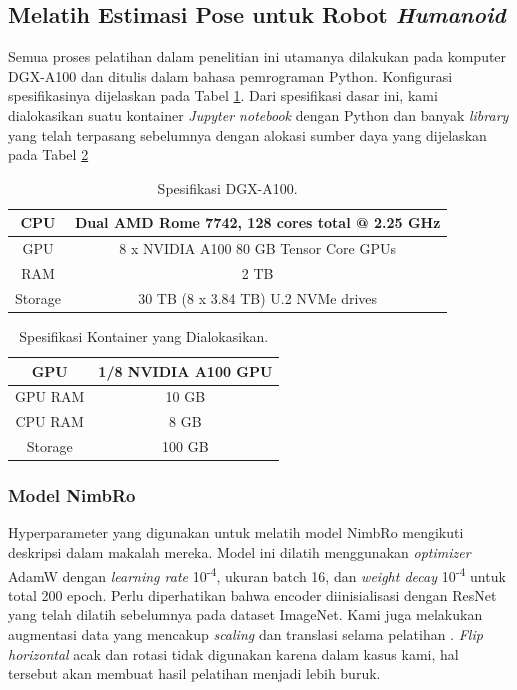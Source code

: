 \subsection{Melatih Estimasi Pose untuk Robot \textit{Humanoid}}
\label{subsec:training-robot}

Semua proses pelatihan dalam penelitian ini utamanya dilakukan pada komputer DGX-A100 dan ditulis dalam bahasa pemrograman Python. Konfigurasi spesifikasinya dijelaskan pada Tabel \ref{tb:dgxa100}.
Dari spesifikasi dasar ini, kami dialokasikan suatu kontainer \textit{Jupyter notebook} dengan Python dan banyak \textit{library} yang telah terpasang sebelumnya dengan alokasi sumber daya yang dijelaskan pada Tabel \ref{tb:allocatedcontainer}
\begin{longtable}{|c|c|}
  \caption{Spesifikasi DGX-A100.}
  \label{tb:dgxa100}\\
  \hline
  CPU     & Dual AMD Rome 7742, 128 cores total @ 2.25 GHz \\
  \hline
  GPU     & 8 x NVIDIA A100 80 GB Tensor Core GPUs  \\
  \hline
  RAM     & 2 TB \\
  \hline
  Storage & 30 TB (8 x 3.84 TB) U.2 NVMe drives \\
  \hline
\end{longtable}

\begin{longtable}{|c|c|}
  \caption{Spesifikasi Kontainer yang Dialokasikan.}
  \label{tb:allocatedcontainer}\\
  \hline
  GPU     & 1/8 NVIDIA A100 GPU \\
  \hline
  GPU RAM & 10 GB  \\
  \hline
  CPU RAM & 8 GB \\
  \hline
  Storage & 100 GB  \\
  \hline
\end{longtable}

\subsubsection{Model NimbRo}
\label{subsubsec:training-nimbro-model}

Hyperparameter yang digunakan untuk melatih model NimbRo mengikuti deskripsi dalam makalah mereka.
Model ini dilatih menggunakan \textit{optimizer} AdamW dengan \textit{learning rate} 10\textsuperscript{-4},
ukuran batch 16, dan \textit{weight decay} 10\textsuperscript{-4} untuk total 200 epoch.
Perlu diperhatikan bahwa encoder diinisialisasi dengan ResNet yang telah dilatih sebelumnya pada dataset ImageNet.
Kami juga melakukan augmentasi data yang mencakup \textit{scaling} dan translasi selama pelatihan \parencite{amini2021}.
\textit{Flip horizontal} acak dan rotasi tidak digunakan karena dalam kasus kami, hal tersebut akan membuat hasil pelatihan menjadi lebih buruk.

